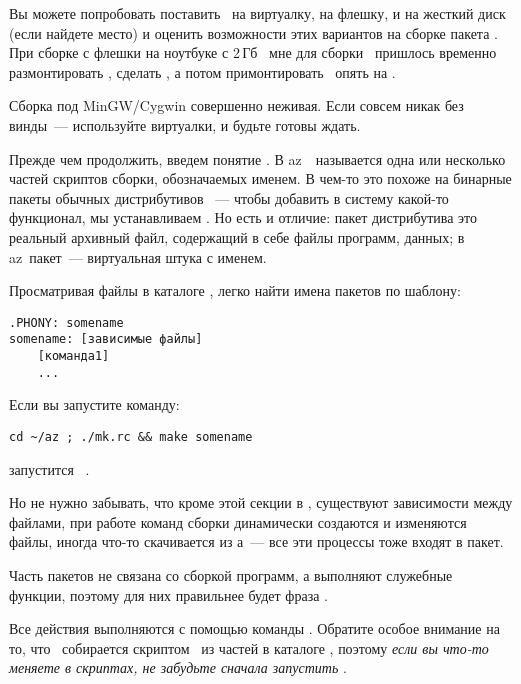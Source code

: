 Вы можете попробовать поставить \linux\ на виртуалку, на флешку, и на жесткий
диск (если найдете место) и оценить возможности этих вариантов на сборке пакета
. При сборке с флешки на ноутбуке с 2\,Гб \ram\ мне для сборки
\ пришлось временно размонтировать , сделать
, а потом примонтировать \
опять на .

Сборка под MinGW/Cygwin совершенно неживая. Если совсем никак без винды\ ---
используйте виртуалки, и будьте готовы ждать.


Прежде чем продолжить, введем понятие . В az\linux\
\ называется одна или несколько частей скриптов сборки,
обозначаемых именем. В чем-то это похоже на бинарные пакеты обычных
дистрибутивов \linux\ --- чтобы добавить в систему какой-то функционал, мы
устанавливаем \term{бинарный пакет}.
Но есть и отличие: пакет дистрибутива это реальный архивный файл, содержащий в
себе файлы программ, данных; в az\linux\ пакет\ --- виртуальная штука с именем.

Просматривая файлы в каталоге \file{mk/}, легко найти имена пакетов по шаблону:

\begin{verbatim}
.PHONY: somename
somename: [зависимые файлы]
    [команда1]
    ...
\end{verbatim}

Если вы запустите команду:

\begin{verbatim}
cd ~/az ; ./mk.rc && make somename
\end{verbatim}

запустится \ .

Но не нужно забывать, что кроме этой секции в \file{.mk}, существуют зависимости
между файлами, при работе команд сборки динамически создаются и изменяются
файлы, иногда что-то скачивается из \internet а\ --- все эти процессы тоже
входят в пакет.

\bigskip
Часть пакетов не связана со сборкой программ, а выполняют служебные функции,
поэтому для них правильнее будет фраза .

\bigskip
Все действия выполняются с помощью команды . Обратите особое
внимание на то, что \ собирается скриптом \ из частей
в каталоге \file{mk/}, поэтому \emph{если вы что-то меняете в скриптах, не
забудьте сначала запустить \pack{./mk.rc}}.


